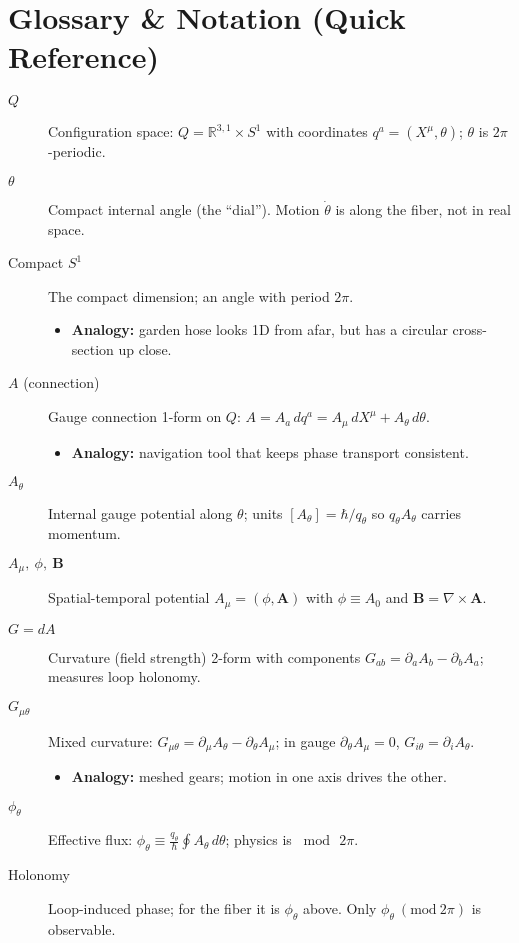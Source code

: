 \section*{Glossary \& Notation (Quick Reference)}
\begin{description}
  \item[$Q$] Configuration space: $Q=\mathbb{R}^{3,1}\times S^1$ with coordinates $q^a=(X^\mu,\theta)$; $\theta$ is $2\pi$-periodic.
  \item[$\theta$] Compact internal angle (the ``dial''). Motion $\dot\theta$ is along the fiber, not in real space.
  \item[Compact $S^1$] The compact dimension; an angle with period $2\pi$.
    \begin{itemize}
      \item \textbf{Analogy:} garden hose looks 1D from afar, but has a circular cross-section up close.
    \end{itemize}
  \item[$A$ (connection)] Gauge connection 1-form on $Q$: $A=A_a\,dq^a= A_\mu\,dX^\mu + A_\theta\,d\theta$.
    \begin{itemize}
      \item \textbf{Analogy:} navigation tool that keeps phase transport consistent.
    \end{itemize}
  \item[$A_\theta$] Internal gauge potential along $\theta$; units $[A_\theta]=\hbar/q_\theta$ so $q_\theta A_\theta$ carries momentum.
  \item[$A_\mu,\ \phi,\ \mathbf B$] Spatial-temporal potential $A_\mu=(\phi,\mathbf A)$ with $\phi\equiv A_0$ and $\mathbf B=\nabla\times \mathbf A$.
  \item[$G=dA$] Curvature (field strength) 2-form with components $G_{ab}=\partial_aA_b-\partial_bA_a$; measures loop holonomy.
  \item[$G_{\mu\theta}$] Mixed curvature: $G_{\mu\theta}=\partial_\mu A_\theta-\partial_\theta A_\mu$; in gauge $\partial_\theta A_\mu=0$, $G_{i\theta}=\partial_i A_\theta$.
    \begin{itemize}
      \item \textbf{Analogy:} meshed gears; motion in one axis drives the other.
    \end{itemize}
  \item[$\phi_\theta$] Effective flux: $\phi_\theta \equiv \tfrac{q_\theta}{\hbar}\oint A_\theta\,d\theta$; physics is $\bmod\,2\pi$.
  \item[Holonomy] Loop-induced phase; for the fiber it is $\phi_\theta$ above. Only $\phi_\theta\ (\mathrm{mod}\ 2\pi)$ is observable.

\end{description}
